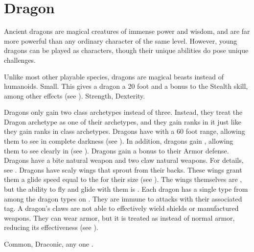 \section{Dragon}
  Ancient dragons are magical creatures of immense power and wisdom, and are far more powerful than any ordinary character of the same level.
  However, young dragons can be played as characters, though their unique abilities do pose unique challenges.

   Unlike most other playable species, dragons are magical beasts instead of humanoids.
   Small. This gives a dragon a 20 foot  and a  bonus to the Stealth skill, among other effects (see ).
    Strength,  Dexterity.
  \begin{itemize}
     Dragons only gain two class archetypes instead of three.
      Instead, they treat the Dragon archetype as one of their archetypes, and they gain ranks in it just like they gain ranks in class archetypes.
     Dragons have  with a 60 foot range, allowing them to see in complete darkness (see ).
      In addition, dragons gain , allowing them to see clearly in  (see ).
     Dragons gain a  bonus to their Armor defense.
     Dragons have a bite natural weapon and two claw natural weapons.
      For details, see .
     Dragons have scaly wings that sprout from their backs.
      These wings grant them a glide speed equal to the  for their size (see ).
      The wings themselves are , but the ability to fly and glide with them is \magical.
     Each dragon has a single type from among the dragon types on .
      They are immune to attacks with their associated tag.
     A dragon's claws are not able to effectively wield shields or manufactured weapons.
      They can wear armor, but it is treated as  instead of normal armor, reducing its effectiveness (see ).
  \end{itemize}
   Common, Draconic, any one .

